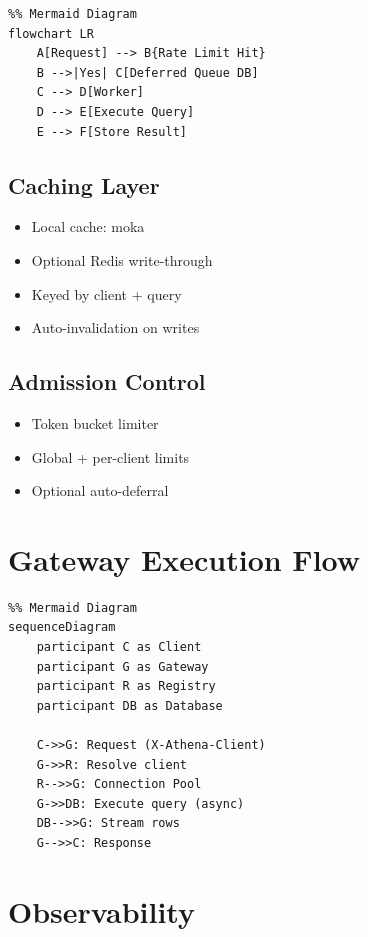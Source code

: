 \documentclass[11pt,a4paper]{article}
\begin{document}
\begin{verbatim}
%% Mermaid Diagram
flowchart LR
    A[Request] --> B{Rate Limit Hit}
    B -->|Yes| C[Deferred Queue DB]
    C --> D[Worker]
    D --> E[Execute Query]
    E --> F[Store Result]
\end{verbatim}

\subsection{Caching Layer}

\begin{itemize}
\item Local cache: moka
\item Optional Redis write-through
\item Keyed by client + query
\item Auto-invalidation on writes
\end{itemize}

\subsection{Admission Control}

\begin{itemize}
\item Token bucket limiter
\item Global + per-client limits
\item Optional auto-deferral
\end{itemize}

\newpage

\section{Gateway Execution Flow}

\begin{verbatim}
%% Mermaid Diagram
sequenceDiagram
    participant C as Client
    participant G as Gateway
    participant R as Registry
    participant DB as Database

    C->>G: Request (X-Athena-Client)
    G->>R: Resolve client
    R-->>G: Connection Pool
    G->>DB: Execute query (async)
    DB-->>G: Stream rows
    G-->>C: Response
\end{verbatim}

\newpage

\section{Observability}
\end{document}
